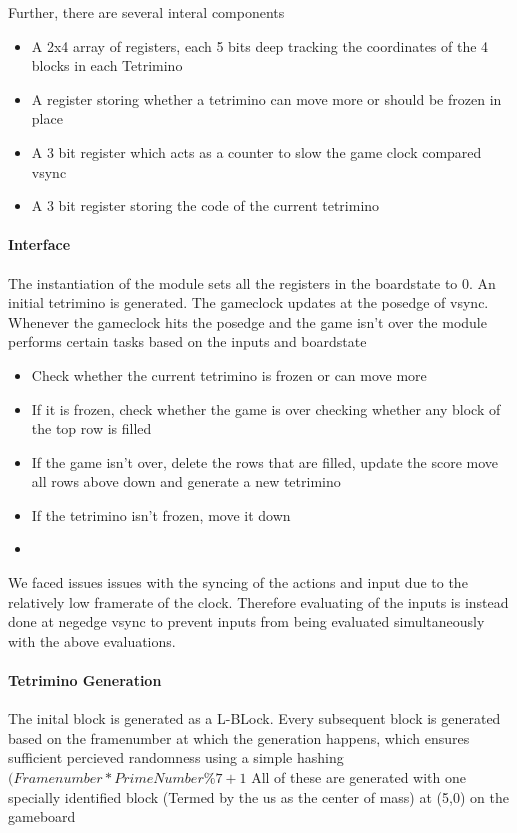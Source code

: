 Further, there are several interal components 
\begin{itemize}
    \item A 2x4 array of registers, each 5 bits deep tracking the coordinates of the 4 blocks in each Tetrimino
    \item A register storing whether a tetrimino can move more or should be frozen in place
    \item A 3 bit register which acts as a counter to slow the game clock compared vsync 
    \item A 3 bit register storing the code of the current tetrimino
\end{itemize}

\paragraph{Interface}
\label{paragraph:interface}
The instantiation of the module sets all the registers in the boardstate to 0. An initial tetrimino is generated.
\newline 
The gameclock updates at the posedge of vsync. Whenever the gameclock hits the posedge and the game isn't over 
the module performs certain tasks based on the inputs and boardstate
\begin{itemize}
    \item Check whether the current tetrimino is frozen or can move more
    \item If it is frozen, check whether the game is over checking whether any block of the top row is filled
    \item If the game isn't over, delete the rows that are filled, update the score move all rows above down and generate a new tetrimino
    \item If the tetrimino isn't frozen, move it down 
    \item 
\end{itemize}
We faced issues issues with the syncing of the actions and input due to the relatively low framerate of the clock. 
Therefore evaluating of the inputs is instead done at negedge vsync to prevent inputs 
from being evaluated simultaneously with the above evaluations.

\paragraph{Tetrimino Generation }
\label{paragraph:tetgen}
The inital block is generated as a L-BLock. 
Every subsequent block is generated based on the framenumber 
at which the generation happens, which ensures sufficient percieved 
randomness using a simple hashing
 \( (Framenumber*PrimeNumber \% 7 +1 \) 
 All of these are generated with one specially identified block
 (Termed by the us as the center of mass) at (5,0) on the gameboard

